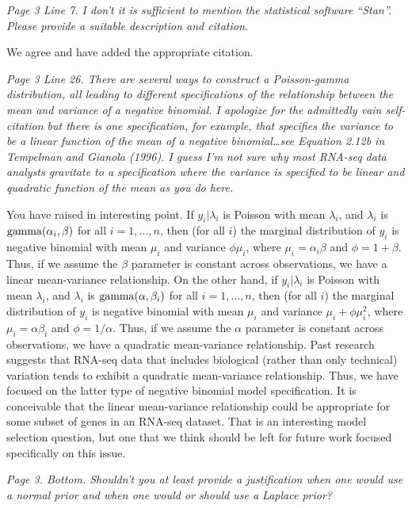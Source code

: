 \documentclass{article}
\newcommand{\comment}[1]{\textit{#1}}
\newcommand{\response}[1]{#1}
\begin{document}
\comment{Page 3 Line 7.  I don’t it is sufficient to mention the statistical software “Stan”.  Please provide a suitable description and citation.}

\response{We agree and have added the appropriate citation.}

\comment{Page 3 Line 26.  There are several ways to construct a Poisson-gamma distribution, all leading to different specifications of the relationship between the mean and variance of a negative binomial.  I apologize for the admittedly vain self-citation but there is one specification, for example, that specifies the variance to be a linear function of the mean of a negative binomial…see Equation 2.12b in  Tempelman and Gianola (1996).  I guess I’m not sure why most RNA-seq data analysts gravitate to a specification where the variance is specified to be linear and quadratic function of the mean as you do here.}

\response{You have raised in interesting point.  If $y_i|\lambda_i$ is Poisson with mean $\lambda_i$, and $\lambda_i$ is ${\rm gamma}(\alpha_i,\beta)$ for all $i=1,\ldots, n$, then (for all $i$) the marginal distribution of $y_i$ is negative binomial with mean $\mu_i$ and variance $\phi\mu_i$, where $\mu_i=\alpha_i\beta$ and $\phi=1+\beta$.  Thus, if we assume the $\beta$ parameter is constant across observations, we have a linear mean-variance relationship.  On the other hand, if $y_i|\lambda_i$ is Poisson with mean $\lambda_i$, and $\lambda_i$ is ${\rm gamma}(\alpha,\beta_i)$ for all $i=1,\ldots, n$, then (for all $i$) the marginal distribution of $y_i$ is negative binomial with mean $\mu_i$ and variance $\mu_i+\phi\mu_i^2$, where $\mu_i=\alpha\beta_i$ and $\phi=1/\alpha$.  Thus, if we assume the $\alpha$ parameter is constant across observations, we have a quadratic mean-variance relationship.  Past research suggests that RNA-seq data that includes biological (rather than only technical) variation tends to exhibit a quadratic mean-variance relationship.  Thus, we have focused on the latter type of negative binomial model specification.  It is conceivable that the linear mean-variance relationship could be appropriate for some subset of genes in an RNA-seq dataset.  That is an interesting model selection question, but one that we think should be left for future work focused specifically on this issue. }

\comment{Page 3. Bottom.  Shouldn’t you at least provide a justification when one would use a normal prior and when one would or should use a Laplace prior?}
\end{document}
